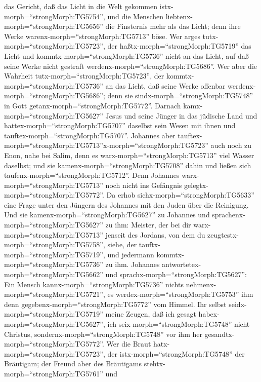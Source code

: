 das Gericht, daß das Licht in die Welt gekommen
istx-morph=``strongMorph:TG5754'', und die Menschen
liebtenx-morph=``strongMorph:TG5656'' die Finsternis mehr als das Licht;
denn ihre Werke warenx-morph=``strongMorph:TG5713'' böse. 
Wer arges tutx-morph=``strongMorph:TG5723'', der
haßtx-morph=``strongMorph:TG5719'' das Licht und
kommtx-morph=``strongMorph:TG5736'' nicht an das Licht, auf daß seine
Werke nicht gestraft werdenx-morph=``strongMorph:TG5686''. 
Wer aber die Wahrheit tutx-morph=``strongMorph:TG5723'', der
kommtx-morph=``strongMorph:TG5736'' an das Licht, daß seine Werke
offenbar werdenx-morph=``strongMorph:TG5686''; denn sie
sindx-morph=``strongMorph:TG5748'' in Gott
getanx-morph=``strongMorph:TG5772''.  Darnach
kamx-morph=``strongMorph:TG5627'' Jesus und seine Jünger in das jüdische
Land und hattex-morph=``strongMorph:TG5707'' daselbst sein Wesen mit
ihnen und tauftex-morph=``strongMorph:TG5707''.  Johannes
aber tauftex-morph=``strongMorph:TG5713''x-morph=``strongMorph:TG5723''
auch noch zu Enon, nahe bei Salim, denn es
warx-morph=``strongMorph:TG5713'' viel Wasser daselbst; und sie
kamenx-morph=``strongMorph:TG5708'' dahin und ließen sich
taufenx-morph=``strongMorph:TG5712''.  Denn Johannes
warx-morph=``strongMorph:TG5713'' noch nicht ins Gefängnis
gelegtx-morph=``strongMorph:TG5772''.  Da erhob
sichx-morph=``strongMorph:TG5633'' eine Frage unter den Jüngern des
Johannes mit den Juden über die Reinigung.  Und sie
kamenx-morph=``strongMorph:TG5627'' zu Johannes und
sprachenx-morph=``strongMorph:TG5627'' zu ihm: Meister, der bei dir
warx-morph=``strongMorph:TG5713'' jenseit des Jordans, von dem du
zeugtestx-morph=``strongMorph:TG5758'', siehe, der
tauftx-morph=``strongMorph:TG5719'', und jedermann
kommtx-morph=``strongMorph:TG5736'' zu ihm.  Johannes
antwortetex-morph=``strongMorph:TG5662'' und
sprachx-morph=``strongMorph:TG5627'': Ein Mensch
kannx-morph=``strongMorph:TG5736'' nichts
nehmenx-morph=``strongMorph:TG5721'', es
werdex-morph=``strongMorph:TG5753'' ihm denn
gegebenx-morph=``strongMorph:TG5772'' vom Himmel.  Ihr
selbst seidx-morph=``strongMorph:TG5719'' meine Zeugen, daß ich gesagt
habex-morph=``strongMorph:TG5627'', ich
seix-morph=``strongMorph:TG5748'' nicht Christus,
sondernx-morph=``strongMorph:TG5748'' vor ihm her
gesandtx-morph=``strongMorph:TG5772''.  Wer die Braut
hatx-morph=``strongMorph:TG5723'', der istx-morph=``strongMorph:TG5748''
der Bräutigam; der Freund aber des Bräutigams
stehtx-morph=``strongMorph:TG5761'' und
